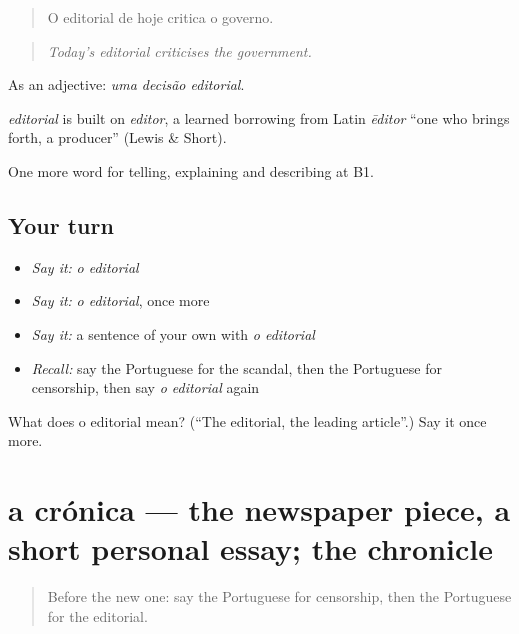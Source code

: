\begin{quote}
O editorial de hoje critica o governo.
\end{quote}

\begin{quote}
\emph{Today’s editorial criticises the government.}
\end{quote}

As an adjective: \emph{uma decisão editorial}.

\begin{cousinweb}
\emph{editorial} is built on \emph{editor}, a learned borrowing from Latin \emph{ēditor} \textquotedblleft{}one who brings forth, a producer\textquotedblright{} (Lewis \& Short).
\end{cousinweb}

\begin{grammarlens}[title={What you've built}]
One more word for telling, explaining and describing at B1.
\end{grammarlens}

\subsection*{Your turn}
\begin{itemize}
\raggedright
  \item \emph{Say it:} \emph{o editorial}
  \item \emph{Say it:} \emph{o editorial}, once more
  \item \emph{Say it:} a sentence of your own with \emph{o editorial}
  \item \emph{Recall:} say the Portuguese for the scandal, then the Portuguese for censorship, then say \emph{o editorial} again
\end{itemize}

\begin{tcolorbox}[breakable,colback=teal!4,colframe=teal!35!black,title={Before you move on}]
What does o editorial mean? (\textquotedblleft{}The editorial, the leading article\textquotedblright{}.) Say it once more.
\end{tcolorbox}
\section[a crónica]{a crónica — the newspaper piece, a short personal essay; the chronicle}

\label{lesson:PT-C284-cronica}



\begin{quote}
Before the new one: say the Portuguese for censorship, then the Portuguese for the editorial.
\end{quote}

